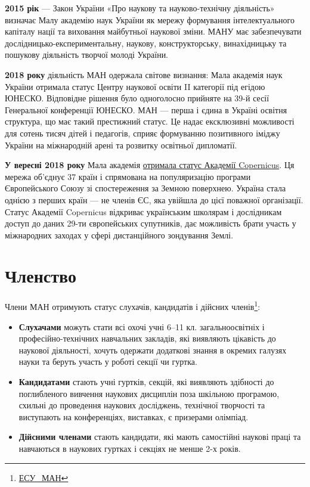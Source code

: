 \documentclass[
  letterpaper,
  DIV=11,
  numbers=noendperiod,
  oneside]{scrartcl}
\providecommand{\tightlist}{%
  \setlength{\itemsep}{0pt}\setlength{\parskip}{0pt}}\usepackage{longtable,booktabs,array}
\begin{document}
\textbf{2015 рік} --- Закон України «Про наукову та науково-технічну
діяльність» визначає Малу академію наук України як мережу формування
інтелектуального капіталу нації та виховання майбутньої наукової зміни.
МАНУ має забезпечувати дослідницько-експериментальну, наукову,
конструкторську, винахідницьку та пошукову діяльність творчої молоді
України.

\textbf{2018 року} діяльність МАН одержала світове визнання: Мала
академія наук України отримала статус Центру наукової освіти II
категорії під егідою ЮНЕСКО. Відповідне рішення було одноголосно
прийняте на 39-й сесії Генеральної конференції ЮНЕСКО. МАН --- перша і
єдина в Україні освітня структура, що має такий престижний статус. Це
надає ексклюзивні можливості для сотень тисяч дітей і педагогів, сприяє
формуванню позитивного іміджу України на міжнародній арені та розвитку
освітньої дипломатії.

\textbf{У вересні 2018 року} Мала академія
\href{https://www.copernicus.eu/en/opportunities/education/copernicus-academy}{отримала
статус Академії Copernicus}. Ця мережа об'єднує 37 країн і спрямована на
популяризацію програми Європейського Союзу зі спостереження за Земною
поверхнею. Україна стала однією з перших країн --- не членів ЄС, яка
увійшла до цієї поважної організації. Статус Академії Copernicus
відкриває українським школярам і дослідникам доступ до даних 29-ти
європейських супутників, дає можливість брати участь у міжнародних
заходах у сфері дистанційного зондування Землі.

\hypertarget{ux447ux43bux435ux43dux441ux442ux432ux43e}{%
\section{Членство}\label{ux447ux43bux435ux43dux441ux442ux432ux43e}}

Члени МАН отримують статус слухачів, кандидатів і дійсних
членів\footnote{\href{https://uk.wikipedia.org/wiki/\%D0\%9C\%D0\%B0\%D0\%BB\%D0\%B0_\%D0\%B0\%D0\%BA\%D0\%B0\%D0\%B4\%D0\%B5\%D0\%BC\%D1\%96\%D1\%8F_\%D0\%BD\%D0\%B0\%D1\%83\%D0\%BA_\%D0\%A3\%D0\%BA\%D1\%80\%D0\%B0\%D1\%97\%D0\%BD\%D0\%B8\#CITEREF\%D0\%95\%D0\%A1\%D0\%A3_\%D0\%9C\%D0\%90\%D0\%9D}{ЕСУ\_МАН}}:

\begin{itemize}
\tightlist
\item
  \textbf{Слухачами} можуть стати всі охочі учні 6--11 кл.
  загальноосвітніх і професійно-технічних навчальних закладів, які
  виявляють цікавість до наукової діяльності, хочуть одержати додаткові
  знання в окремих галузях науки та беруть участь у роботі секції чи
  гуртка.
\item
  \textbf{Кандидатами} стають учні гуртків, секцій, які виявляють
  здібності до поглибленого вивчення наукових дисциплін поза шкільною
  програмою, схильні до проведення наукових досліджень, технічної
  творчості та виступають на конференціях, виставках, є призерами
  олімпіад.
\item
  \textbf{Дійсними членами} стають кандидати, які мають самостійні
  наукові праці та навчаються в наукових гуртках і секціях не менше 2-х
  років.
\end{itemize}
\end{document}
